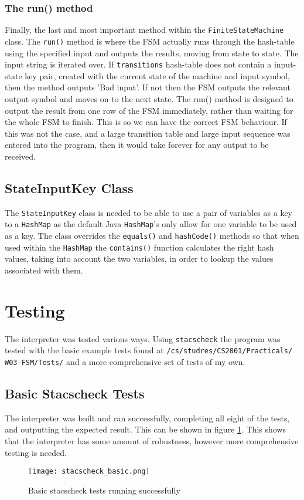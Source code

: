 \documentclass{article}
\begin{document}
\subsubsection{The run() method}
Finally, the last and most important method within the \verb+FiniteStateMachine+ class. The \verb+run()+ method is where the FSM actually runs through the hash-table using the specified input and outputs the results, moving from state to state. The input string is iterated over. If \verb+transitions+ hash-table does not contain a input-state key pair, created with the current state of the machine and input symbol, then the method outputs 'Bad input'. If not then the FSM outputs the relevant output symbol and moves on to the next state. The run() method is designed to output the result from one row of the FSM immediately, rather than waiting for the whole FSM to finish. This is so we can have the correct FSM behaviour. If this was not the case, and a large transition table and large input sequence was entered into the program, then it would take forever for any output to be received.
\subsection{StateInputKey Class}
The \verb+StateInputKey+ class is needed to be able to use a pair of variables as a key to a \verb+HashMap+ as the default Java \verb+HashMap+'s only allow for one variable to be used as a key. The class overrides the \verb+equals()+ and \verb+hashCode()+ methods so that when used within the \verb+HashMap+ the \verb+contains()+ function calculates the right hash values, taking into account the two variables, in order to lookup the values associated with them.
\section{Testing}
The interpreter was tested various ways. Using \verb+stacscheck+ the program was tested with the basic example tests found at \verb+/cs/studres/CS2001/Practicals/+
\verb+W03-FSM/Tests/+ and a more comprehensive set of tests of my own.
\subsection{Basic Stacscheck Tests}
The interpreter was built and ran successfully, completing all eight of the tests, and outputting the expected result. This can be shown in figure \ref{fig:stacscheck_basic}. This shows that the interpreter has some amount of robustness, however more comprehensive testing is needed.
\begin{figure}[h]
\centering
\texttt{[image: stacscheck\_basic.png]}
\caption{Basic stacscheck tests running successfully}
\label{fig:stacscheck_basic}
\end{figure}
\end{document}
